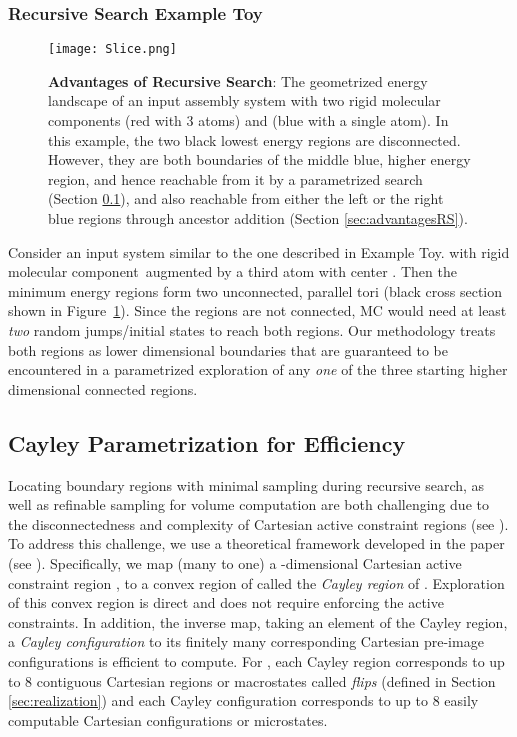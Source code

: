 \documentclass[]{article}
\newcommand{\figref}[1]{Figure~\ref{#1}}
\newcommand{\rmc}{rigid molecular component}
\newcommand{\toythreed}{Toy}
\newcommand{\rahul}[1]{\color{black}{#1}\color{black}}
\begin{document}
\subsubsection{Recursive Search Example \toythreed}
\label{sec:CartesianDisconnectedness}
\begin{figure}[htpb]
\centering
\texttt{[image: Slice.png]}
\caption{\scriptsize \textbf{Advantages of Recursive Search}:
The geometrized energy landscape of an input assembly system with two \rmc s 
 (red with 3 atoms) and  (blue with a single atom). In this example, 
the two black lowest energy regions are disconnected. However, they are both 
boundaries of the middle blue, higher energy region, and hence reachable from 
it by a parametrized search (Section \ref{sec:convexification}), and also 
reachable from either the left or the right blue regions through
ancestor addition (Section \ref{sec:advantagesRS}).
}
\label{fig:slice} 
\end{figure}
Consider an input system similar to the one described in Example \toythreed.
with \rmc\  augmented by a third atom with center . Then the
minimum energy regions form two unconnected, parallel tori (black cross section shown in 
\figref{fig:slice}). Since the regions are not connected, MC would need at
least \emph{two} random jumps/initial states to reach both regions. Our
methodology treats both regions as lower dimensional boundaries that are
guaranteed to be encountered in a parametrized exploration of any \emph{one} of
the three starting higher dimensional connected regions.
\subsection{Cayley Parametrization for Efficiency}
\label{sec:convexification} 
Locating boundary regions with minimal sampling during recursive search, as
well as refinable sampling for volume computation are both challenging due to
the disconnectedness and complexity of Cartesian active constraint regions (see
\rahul{Section \ref{sec:correspondanceCayleyCart}}). To address this challenge,
we use a theoretical framework developed in the paper\cite{SiGa:2010} (see
\rahul{Section \ref{sec:app:convexity} of the Appendix}). Specifically, we map (many to one) a
-dimensional Cartesian active constraint region , to a convex region of
 called the \emph{Cayley region} of . Exploration of this
convex region is direct and does not require enforcing the active constraints.
In addition, the inverse map, taking an element of the Cayley region, a
\emph{Cayley configuration} to its finitely many corresponding Cartesian
pre-image configurations is efficient to compute. For , each Cayley region
corresponds to up to 8 contiguous Cartesian regions or macrostates called
\emph{flips} (defined in Section \ref{sec:realization}) and each Cayley
configuration corresponds to up to 8 easily computable Cartesian configurations
or microstates.
\end{document}

